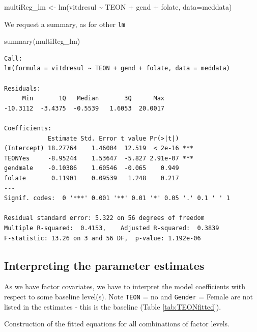 \documentclass[
  oneside]{krantz}
\newenvironment{Shaded}{\begin{snugshade}}{\end{snugshade}}
\newcommand{\AttributeTok}[1]{\textcolor[rgb]{0.77,0.63,0.00}{#1}}
\newcommand{\FunctionTok}[1]{\textcolor[rgb]{0.00,0.00,0.00}{#1}}
\newcommand{\NormalTok}[1]{#1}
\newcommand{\OtherTok}[1]{\textcolor[rgb]{0.56,0.35,0.01}{#1}}
\newcommand{\SpecialCharTok}[1]{\textcolor[rgb]{0.00,0.00,0.00}{#1}}
\begin{document}
\begin{Shaded}
\begin{Highlighting}[]
\NormalTok{multiReg\_lm }\OtherTok{\textless{}{-}} \FunctionTok{lm}\NormalTok{(vitdresul }\SpecialCharTok{\textasciitilde{}}\NormalTok{ TEON }\SpecialCharTok{+}\NormalTok{ gend }\SpecialCharTok{+}\NormalTok{ folate, }\AttributeTok{data=}\NormalTok{meddata)}
\end{Highlighting}
\end{Shaded}

We request a summary, as for other \texttt{lm}

\begin{Shaded}
\begin{Highlighting}[]
\FunctionTok{summary}\NormalTok{(multiReg\_lm)}
\end{Highlighting}
\end{Shaded}

\begin{verbatim}
Call:
lm(formula = vitdresul ~ TEON + gend + folate, data = meddata)

Residuals:
     Min       1Q   Median       3Q      Max 
-10.3112  -3.4375  -0.5539   1.6053  20.0017 

Coefficients:
            Estimate Std. Error t value Pr(>|t|)    
(Intercept) 18.27764    1.46004  12.519  < 2e-16 ***
TEONYes     -8.95244    1.53647  -5.827 2.91e-07 ***
gendmale    -0.10386    1.60546  -0.065    0.949    
folate       0.11901    0.09539   1.248    0.217    
---
Signif. codes:  0 '***' 0.001 '**' 0.01 '*' 0.05 '.' 0.1 ' ' 1

Residual standard error: 5.322 on 56 degrees of freedom
Multiple R-squared:  0.4153,    Adjusted R-squared:  0.3839 
F-statistic: 13.26 on 3 and 56 DF,  p-value: 1.192e-06
\end{verbatim}

\hypertarget{interpreting-the-parameter-estimates}{%
\subsection{Interpreting the parameter estimates}\label{interpreting-the-parameter-estimates}}

As we have factor covariates, we have to interpret the model coefficients with respect to some baseline level(s). Note \texttt{TEON} = no and \texttt{Gender} = Female are not listed in the estimates - this is the baseline (Table \ref{tab:TEONfitted}).

\label{tab:TEONfitted} Construction of the fitted equations for all combinations of factor levels.
\end{document}
